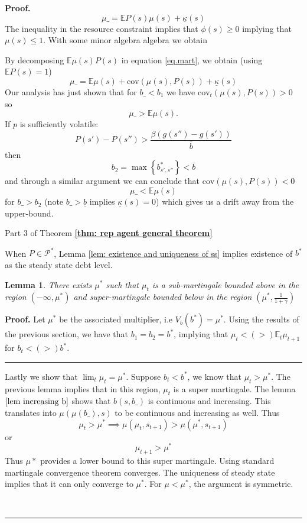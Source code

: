 \documentclass[thmsb,11pt]{article}
\newtheorem{lemma}{Lemma}
\newcommand{\EE}{\mathbb E}
\newcommand{\cov}{\mathrm{cov}}
\newenvironment{proof}[1][Proof]{\noindent \textbf{#1.} }{\  \rule{0.5em}{0.5em}}
\begin{document}
\begin{proof}
\begin{equation}\label{eq.mart}
	\mu\_ = \EE P(s)\mu(s)+\underline{\kappa}(s)
\end{equation}  The inequality in the resource constraint implies that $\phi(s)\geq 0$ implying that $\mu(s) \leq 1$.  With some minor algebra algebra we obtain

By decomposing $\EE \mu(s)P(s)$ in equation \eqref{eq.mart}, we obtain (using $\EE P(s) = 1$)
\begin{equation}
	\mu\_ = \EE\mu(s) +\cov (\mu(s),P(s)) + \underline \kappa(s)
\end{equation}Our analysis has just shown that for $b\_ < b_1$ we have $\cov_t (\mu(s),P(s))  >0$ so
\[
	\mu\_> \EE\mu(s).
\]  If $p$ is sufficiently volatile:
\[
	P(s') - P(s'') > \frac{\beta(g(s'')-g(s'))}{\overline b}
\] then
\[
	b_2 = \max\left\{b^*_{s',s''}\right\} <\overline b
\] and through a similar argument  we can conclude that $\cov(\mu(s),P(s)) < 0$
\[
	\mu\_ < \EE \mu (s)
\] for $b\_ > b_2$ (note $b\_ >\underline b$ implies $\underline \kappa(s) =0$) which gives us a drift away from the upper-bound.


{Part 3 of Theorem \textbf{\ref{thm: rep agent general theorem}}}


When $P\in\mathcal{P}^*$, Lemma \ref{lem: existence and uniqueness of ss} implies existence of $b^*$ as the steady state debt level.
\begin{lemma}
\label{sub super martingale}
There exists $\mu^*$ such that $\mu_t$  is a sub-martingale bounded above in the region $(-\infty,\mu^*)$ and super-martingale bounded below in the region $(\mu^*,\frac{1}{1+\gamma})$


\end{lemma}
\begin{proof}
Let $\mu^*$ be the associated multiplier, i.e $V_b(b^*)=\mu^*$.  Using the results of the previous section, we have that $b_1 = b_2 = b^*$, implying that $\mu_t < (>) \EE_t\mu_{t+1}$ for $b_t  < (>) b^*$.
\end{proof}

Lastly we show that $\lim_t \mu_t=\mu^*$. Suppose $b_{t}<b^*$, we know that $\mu_t>\mu^*$. The previous lemma implies that in this region, $\mu_t$ is a super martingale. The lemma $\ref{lem increasing b}$ shows that $b(s,b\_)$ is continuous and increasing. This translates into $\mu(\mu(b\_),s)$ to be continuous and increasing as well.
 Thus
 \[\mu_{t}>\mu^* \implies \mu(\mu_{t},s_{t+1})>\mu(\mu^*,s_{t+1}) \]
or
 \[\mu_{t+1}>\mu^*\]
Thus $\mu*$  provides a lower bound to this super martingale. Using standard martingale convergence theorem converges. The uniqueness of steady state implies that it can only converge to $\mu^*$. For $\mu<\mu^*$, the argument is symmetric.


\end{proof}
\end{document}
